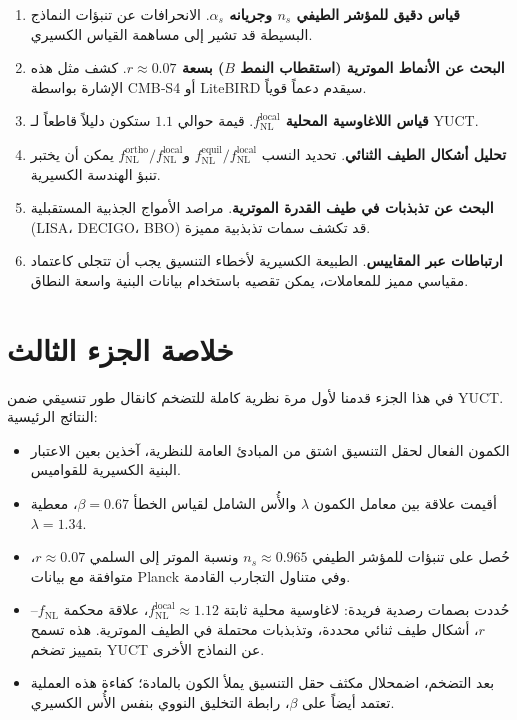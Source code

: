 \documentclass[12pt,a4paper]{article}
\begin{document}
	\begin{enumerate}
		\item \textbf{قياس دقيق للمؤشر الطيفي \(n_s\) وجريانه \(\alpha_s\)}. الانحرافات عن تنبؤات النماذج البسيطة قد تشير إلى مساهمة القياس الكسيري.
		\item \textbf{البحث عن الأنماط الموترية (استقطاب النمط \(B\)) بسعة \(r \approx 0.07\)}. كشف مثل هذه الإشارة بواسطة CMB‑S4 أو LiteBIRD سيقدم دعماً قوياً.
		\item \textbf{قياس اللاغاوسية المحلية \(f_{\text{NL}}^{\text{local}}\)}. قيمة حوالي \(1.1\) ستكون دليلاً قاطعاً لـ YUCT.
		\item \textbf{تحليل أشكال الطيف الثنائي}. تحديد النسب \(f_{\text{NL}}^{\text{equil}}/f_{\text{NL}}^{\text{local}}\) و\(f_{\text{NL}}^{\text{ortho}}/f_{\text{NL}}^{\text{local}}\) يمكن أن يختبر تنبؤ الهندسة الكسيرية.
		\item \textbf{البحث عن تذبذبات في طيف القدرة الموترية}. مراصد الأمواج الجذبية المستقبلية (LISA، DECIGO، BBO) قد تكشف سمات تذبذبية مميزة.
		\item \textbf{ارتباطات عبر المقاييس}. الطبيعة الكسيرية لأخطاء التنسيق يجب أن تتجلى كاعتماد مقياسي مميز للمعاملات، يمكن تقصيه باستخدام بيانات البنية واسعة النطاق.
	\end{enumerate}
	
	\section{خلاصة الجزء الثالث}
	\label{sec:conclusion-inflation}
	
	في هذا الجزء قدمنا لأول مرة نظرية كاملة للتضخم كانقال طور تنسيقي ضمن YUCT. النتائج الرئيسية:
	
	\begin{itemize}
		\item الكمون الفعال لحقل التنسيق اشتق من المبادئ العامة للنظرية، آخذين بعين الاعتبار البنية الكسيرية للقواميس.
		\item أقيمت علاقة بين معامل الكمون \(\lambda\) والأُس الشامل لقياس الخطأ \(\beta = 0.67\)، معطية \(\lambda = 1.34\).
		\item حُصل على تنبؤات للمؤشر الطيفي \(n_s \approx 0.965\) ونسبة الموتر إلى السلمي \(r \approx 0.07\)، متوافقة مع بيانات Planck وفي متناول التجارب القادمة.
		\item حُددت بصمات رصدية فريدة: لاغاوسية محلية ثابتة \(f_{\text{NL}}^{\text{local}} \approx 1.12\)، علاقة محكمة \(f_{\text{NL}}\)–\(r\)، أشكال طيف ثنائي محددة، وتذبذبات محتملة في الطيف الموترية. هذه تسمح بتمييز تضخم YUCT عن النماذج الأخرى.
		\item بعد التضخم، اضمحلال مكثف حقل التنسيق يملأ الكون بالمادة؛ كفاءة هذه العملية تعتمد أيضاً على \(\beta\)، رابطة التخليق النووي بنفس الأُس الكسيري.
	\end{itemize}
	
\end{document}

